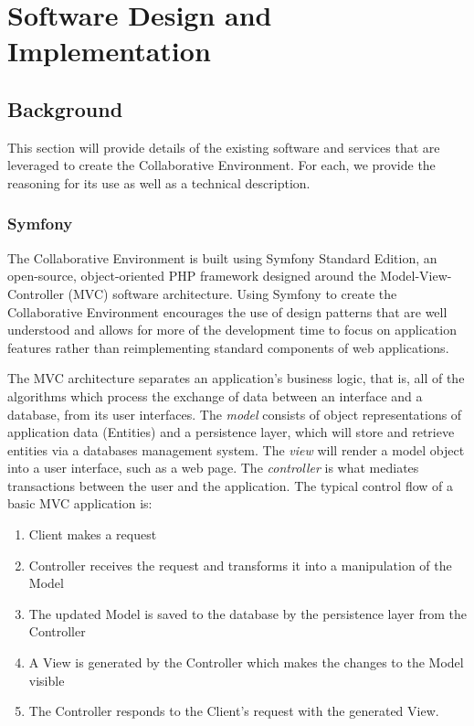 \chapter{Software Design and Implementation}
\label{chap:software-design}
 
\section{Background}
This section will provide details of the existing software and services that are leveraged to create the Collaborative Environment. For each, we provide the reasoning for its use as well as a technical description.

\subsection{Symfony}
The Collaborative Environment is built using Symfony Standard Edition, an open-source, object-oriented PHP framework designed around the Model-View-Controller (MVC) software architecture. Using Symfony to create the Collaborative Environment encourages the use of design patterns that are well understood and allows for more of the development time to focus on application features rather than reimplementing standard components of web applications.

The MVC architecture separates an application's business logic, that is, all of the algorithms which process the exchange of data between an interface and a database, from its user interfaces. The \emph{model} consists of object representations of application data (Entities) and a persistence layer, which will store and retrieve entities via a databases management system. The \emph{view} will render a model object into a user interface, such as a web page. The \emph{controller} is what mediates transactions between the user and the application. The typical control flow of a basic MVC application is:

\begin{singlespacing}
\begin{enumerate}
	\item Client makes a request
	\item Controller receives the request and transforms it into a manipulation of the Model
	\item The updated Model is saved to the database by the persistence layer from the Controller
	\item A View is generated by the Controller which makes the changes to the Model visible
	\item The Controller responds to the Client's request with the generated View.
\end{enumerate}
\end{singlespacing}

